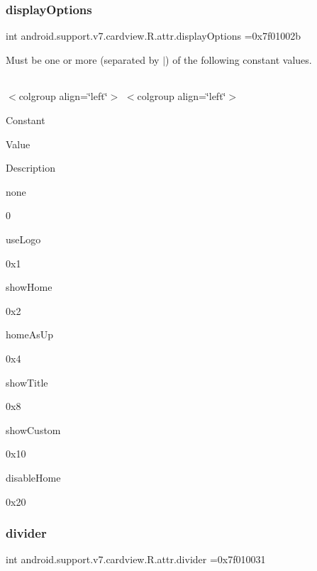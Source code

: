\subsubsection{\texorpdfstring{display\+Options}{displayOptions}}
{\footnotesize\ttfamily int android.\+support.\+v7.\+cardview.\+R.\+attr.\+display\+Options =0x7f01002b\hspace{0.3cm}{\ttfamily [static]}}

Must be one or more (separated by \textquotesingle{}$\vert$\textquotesingle{}) of the following constant values.

\tabulinesep=1mm
\begin{longtabu} spread 0pt [c]{*{0}{|X[-1]}|}
\hline
\end{longtabu}
$<$colgroup align=\char`\"{}left\char`\"{}$>$ $<$colgroup align=\char`\"{}left\char`\"{}$>$ 

Constant

Value

Description 

{\ttfamily none}

0

{\ttfamily use\+Logo}

0x1

{\ttfamily show\+Home}

0x2

{\ttfamily home\+As\+Up}

0x4

{\ttfamily show\+Title}

0x8

{\ttfamily show\+Custom}

0x10

{\ttfamily disable\+Home}

0x20\mbox{\label{classandroid_1_1support_1_1v7_1_1cardview_1_1R_1_1attr_af372fbb85ebef799e994b3e8ddd80ffc}} 
\subsubsection{\texorpdfstring{divider}{divider}}
{\footnotesize\ttfamily int android.\+support.\+v7.\+cardview.\+R.\+attr.\+divider =0x7f010031\hspace{0.3cm}{\ttfamily [static]}}

